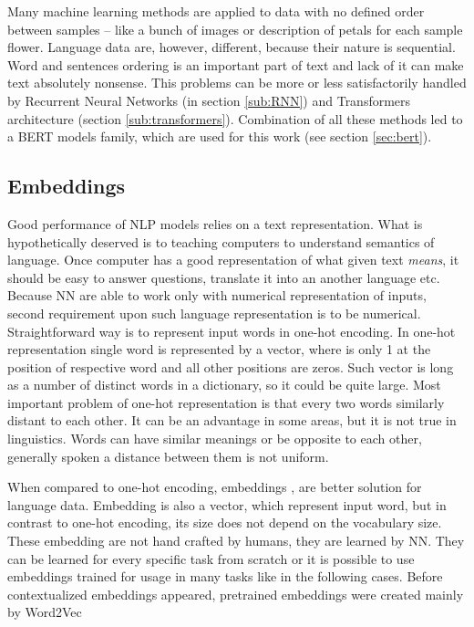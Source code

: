 Many machine learning methods are applied to data with no defined order between samples -- like a bunch of images or description of petals for each sample flower. %
Language data are, however, different, because their nature is sequential. Word and sentences ordering is an important part of text and lack of it can make text absolutely nonsense. This problems can be more or less satisfactorily handled by Recurrent Neural Networks (in section \ref{sub:RNN}) and Transformers architecture (section \ref{sub:transformers}). Combination of all these methods led to a BERT models family, which are used for this work (see section \ref{sec:bert}).


\subsection{Embeddings}
\label{sec:embedd}
Good performance of NLP models relies on a text representation. What is hypothetically deserved is to teaching computers to understand semantics of language. Once computer has a good representation of what given text \textit{means}, it should be easy to answer questions, translate it into an another language etc. Because NN are able to work only with numerical representation of inputs, second requirement upon such language representation is to be numerical. Straightforward way is to represent input words in one-hot encoding. In one-hot representation single word is represented by a vector, where is only 1 at the position of respective word and all other positions are zeros. Such vector is long as a number of distinct words in a dictionary, so it could be quite large. Most important problem of one-hot representation is that every two words similarly distant to each other. It can be an advantage in some areas, but it is not true in linguistics. Words can have similar meanings or be opposite to each other, generally spoken a distance between them is not uniform.
\par
When compared to one-hot encoding, embeddings  \citep{Bengio2003}, \citep{Ling} are better solution for language data. Embedding is also a vector, which represent input word, but in contrast to one-hot encoding, its size does not depend on the vocabulary size. These embedding are not hand crafted by humans, they are learned by NN. They can be learned for every specific task from scratch or it is possible to use embeddings trained for usage in many tasks like in the following cases.
Before contextualized embeddings appeared, pretrained embeddings were created mainly by Word2Vec \citep{Mikolov2013}  
